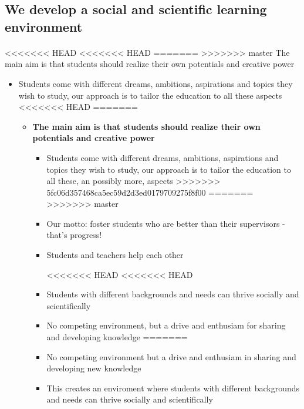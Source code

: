 \documentclass[%
<<<<<<< HEAD
<<<<<<< HEAD
oneside,                 %
final,                   %
=======
twoside,                 %
final,                   %
>>>>>>> 5fc06d357468ca5ec59d2d3ed0179709275f8f00
=======
oneside,                 %
final,                   %
>>>>>>> master
10pt]{article}
\begin{document}


\subsection*{We develop a social and scientific learning environment}


\paragraph{}
<<<<<<< HEAD
<<<<<<< HEAD
=======
>>>>>>> master
The main aim is that students should realize their own potentials and creative power

\begin{itemize}
 \item Students come with different dreams, ambitions, aspirations and topics they wish to study, our approach is to tailor the education to all these aspects
<<<<<<< HEAD
=======
\begin{itemize}
\item \textbf{The main aim is that students should realize their own potentials and creative power}
\begin{itemize}

 \item Students come with different dreams, ambitions, aspirations and topics they wish to study, our approach is to tailor the education to all these, an possibly more, aspects
>>>>>>> 5fc06d357468ca5ec59d2d3ed0179709275f8f00
=======
>>>>>>> master

 \item Our motto: foster students who are better than their supervisors - that's progress!

 \item Students and teachers help each other

<<<<<<< HEAD
<<<<<<< HEAD
 \item Students with different backgrounds and needs can thrive socially and scientifically

 \item No competing environment, but a drive and enthusiam for sharing and developing knowledge
=======
 \item No competing environment but a drive and enthusiam in sharing and developing new knowledge

 \item This creates an enviroment where students with different backgrounds and needs can thrive socially and scientifically


\end{itemize}
\end{itemize}
\end{itemize}
\end{document}
